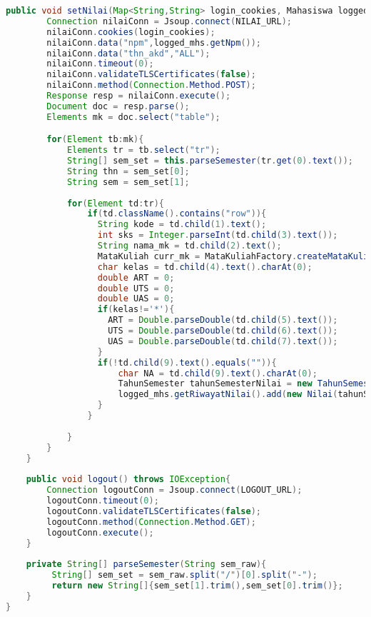 \begin{lstlisting}[language=Java,basicstyle=\tiny,caption=Scraper.java]
    public void setNilai(Map<String,String> login_cookies, Mahasiswa logged_mhs) throws IOException{  
        Connection nilaiConn = Jsoup.connect(NILAI_URL);
        nilaiConn.cookies(login_cookies);
        nilaiConn.data("npm",logged_mhs.getNpm());
        nilaiConn.data("thn_akd","ALL");
        nilaiConn.timeout(0);
        nilaiConn.validateTLSCertificates(false); 
        nilaiConn.method(Connection.Method.POST);
        Response resp = nilaiConn.execute();
        Document doc = resp.parse();
        Elements mk = doc.select("table");

        for(Element tb:mk){
            Elements tr = tb.select("tr");
            String[] sem_set = this.parseSemester(tr.get(0).text());
            String thn = sem_set[0];
            String sem = sem_set[1]; 
            
            for(Element td:tr){           
                if(td.className().contains("row")){
                  String kode = td.child(1).text();
                  int sks = Integer.parseInt(td.child(3).text());
                  String nama_mk = td.child(2).text();
                  MataKuliah curr_mk = MataKuliahFactory.createMataKuliah(kode, sks, nama_mk);
                  char kelas = td.child(4).text().charAt(0);
                  double ART = 0;
                  double UTS = 0;
                  double UAS = 0;
                  if(kelas!='*'){
                    ART = Double.parseDouble(td.child(5).text());
                    UTS = Double.parseDouble(td.child(6).text());
                    UAS = Double.parseDouble(td.child(7).text());
                  }  
                  if(!td.child(9).text().equals("")){
                	  char NA = td.child(9).text().charAt(0);
                	  TahunSemester tahunSemesterNilai = new TahunSemester(Integer.parseInt(thn),Semester.fromString(sem));
                      logged_mhs.getRiwayatNilai().add(new Nilai(tahunSemesterNilai, curr_mk, kelas, ART, UTS, UAS, NA));
                  }	    
                }
                
            }
        }
    }
    
    public void logout() throws IOException{
        Connection logoutConn = Jsoup.connect(LOGOUT_URL);
        logoutConn.timeout(0);
        logoutConn.validateTLSCertificates(false);
        logoutConn.method(Connection.Method.GET);
        logoutConn.execute();
    }
    
    private String[] parseSemester(String sem_raw){
         String[] sem_set = sem_raw.split("/")[0].split("-");
         return new String[]{sem_set[1].trim(),sem_set[0].trim()};
    }    
}
\end{lstlisting}